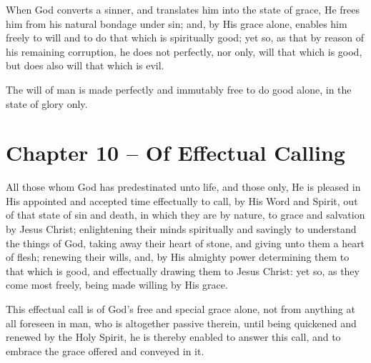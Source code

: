 \begin{outerlst}[left=0pt,labelsep=0pt]
\begin{innerlst}[resume*]
\item When God converts a sinner, and translates him into the state of grace, He frees him from his natural bondage under sin; and, by His grace alone, enables him freely to will and to do that which is spiritually good; yet so, as that by reason of his remaining corruption, he does not perfectly, nor only, will that which is good, but does also will that which is evil.    

\item The will of man is made perfectly and immutably free to do good alone, in the state of glory only.  
\end{innerlst}

\item
{}
\section{Chapter 10 -- Of Effectual Calling}
\begin{innerlst}[resume*]

\item All those whom God has predestinated unto life, and those only, He is pleased in His appointed and accepted time effectually to call, by His Word and Spirit, out of that state of sin and death, in which they are by nature, to grace and salvation by Jesus Christ; enlightening their minds spiritually and savingly to understand the things of God, taking away their heart of stone, and giving unto them a heart of flesh; renewing their wills, and, by His almighty power determining them to that which is good, and effectually drawing them to Jesus Christ: yet so, as they come most freely, being made willing by His grace.   

\item This effectual call is of God's free and special grace alone, not from anything at all foreseen in man, who is altogether passive therein, until being quickened and renewed by the Holy Spirit, he is thereby enabled to answer this call, and to embrace the grace offered and conveyed in it.   


\end{innerlst}
\end{outerlst}
